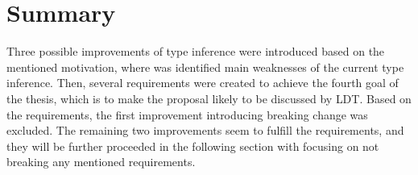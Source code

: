 \section{Summary}

Three possible improvements of type inference were introduced based on the mentioned motivation, where was identified main weaknesses of the current type inference. 
Then, several requirements were created to achieve the fourth goal of the thesis, which is to make the proposal likely to be discussed by \ac{LDT}. 
Based on the requirements, the first improvement introducing breaking change was excluded. 
The remaining two improvements seem to fulfill the requirements, and they will be further proceeded in the following section with focusing on not breaking any mentioned requirements.